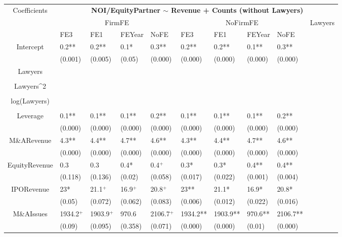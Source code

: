 \documentclass{article}
\begin{document}
\begin{table}[H]
\centering
\begin{tabular}{|clllllllll|}
\hline
\multirow{3}{*}{Coefficients} & \multicolumn{9}{c|}{\textbf{NOI/EquityPartner $\sim$ Revenue + Counts (without Lawyers)}} \\
\cline{2-10}
& \multicolumn{4}{c}{FirmFE} & \multicolumn{4}{c}{NoFirmFE} & \multirow{2}{*}{Lawyers} \\
\cline{2-9}
& FE3 & FE1 & FEYear & NoFE & FE3 & FE1 & FEYear & NoFE &  \\
\hline
 
Intercept & 0.2** & 0.2** & 0.1* & 0.3** & 0.2** & 0.2** & 0.1** & 0.3** & \\ 
   & (0.001) & (0.005) & (0.05) & (0.000) & (0.000) & (0.000) & (0.000) & (0.000) & \\ 
  Lawyers &  &  &  &  &  &  &  &  & \\ 
   &  &  &  &  &  &  &  &  & \\ 
  Lawyers^2 &  &  &  &  &  &  &  &  & \\ 
   &  &  &  &  &  &  &  &  & \\ 
  log(Lawyers) &  &  &  &  &  &  &  &  & \\ 
   &  &  &  &  &  &  &  &  & \\ 
  Leverage & 0.1** & 0.1** & 0.1** & 0.2** & 0.1** & 0.1** & 0.1** & 0.2** & \\ 
   & (0.000) & (0.000) & (0.000) & (0.000) & (0.000) & (0.000) & (0.000) & (0.000) & \\ 
  M\&ARevenue & 4.3** & 4.4** & 4.7** & 4.6** & 4.3** & 4.4** & 4.7** & 4.6** & \\ 
   & (0.000) & (0.000) & (0.000) & (0.000) & (0.000) & (0.000) & (0.000) & (0.000) & \\ 
  EquityRevenue & 0.3 & 0.3 & 0.4* & 0.4$^{+}$ & 0.3* & 0.3* & 0.4** & 0.4** & \\ 
   & (0.118) & (0.136) & (0.02) & (0.058) & (0.017) & (0.022) & (0.001) & (0.004) & \\ 
  IPORevenue & 23* & 21.1$^{+}$ & 16.9$^{+}$ & 20.8$^{+}$ & 23** & 21.1* & 16.9* & 20.8* & \\ 
   & (0.05) & (0.072) & (0.062) & (0.083) & (0.006) & (0.012) & (0.022) & (0.016) & \\ 
  M\&AIssues & 1934.2$^{+}$ & 1903.9$^{+}$ & 970.6 & 2106.7$^{+}$ & 1934.2** & 1903.9** & 970.6** & 2106.7** & \\ 
   & (0.09) & (0.095) & (0.358) & (0.071) & (0.000) & (0.000) & (0.01) & (0.000) & \\ 

\end{tabular}
\end{table}
\end{document}
